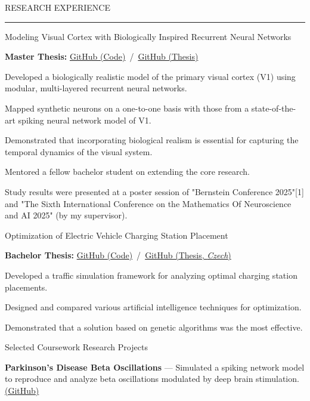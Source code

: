 \documentclass{resume} %
\renewenvironment{rSection}[1]{
\sectionskip
\textcolor{CarnegieMellonRed}{\MakeUppercase{#1}}
\sectionlineskip
\hrule
\begin{list}{}{
\setlength{\leftmargin}{1.5em}
}
\item[]
}{
\end{list}
}
\begin{document}
\begin{rSection}{Research Experience}
\begin{rProject}{\large Modeling Visual Cortex with Biologically Inspired Recurrent Neural Networks}{}{}{}
    \item {\bf Master Thesis:} \href{https://github.com/dbeinhauer/mcs-source}{GitHub (Code)} \,/\, \href{https://github.com/dbeinhauer/mcs-thesis}{GitHub (Thesis)}
    \item Developed a biologically realistic model of the primary visual cortex (V1) using modular, multi-layered recurrent neural networks.
    \item Mapped synthetic neurons on a one-to-one basis with those from a state-of-the-art spiking neural network model of V1.
    \item Demonstrated that incorporating biological realism is essential for capturing the temporal dynamics of the visual system.
    \item Mentored a fellow bachelor student on extending the core research.
    \item Study results were presented at a poster session of "Bernstein Conference 2025"[1] and "The Sixth International Conference on the Mathematics Of Neuroscience and AI 2025" (by my supervisor).
\end{rProject}

\begin{rProject}{\large Optimization of Electric Vehicle Charging Station Placement}{}{}{}
    \item {\bf Bachelor Thesis:} \href{https://github.com/dbeinhauer/bcs-source}{GitHub (Code)} \,/\, \href{https://github.com/dbeinhauer/bcs-thesis}{GitHub (Thesis, \emph{Czech})}
    \item Developed a traffic simulation framework for analyzing optimal charging station placements.
    \item Designed and compared various artificial intelligence techniques for optimization.
    \item Demonstrated that a solution based on genetic algorithms was the most effective.
\end{rProject}

\begin{rProject}{\large Selected Coursework Research Projects}{}{}{}

\item \textbf{Parkinson's Disease Beta Oscillations} — Simulated a spiking network model to reproduce and analyze beta oscillations modulated by deep brain stimulation. {\href{https://github.com/dbeinhauer/parkinson_disease_project}{(GitHub)}}


\end{rProject}
\end{rSection}
\end{document}
